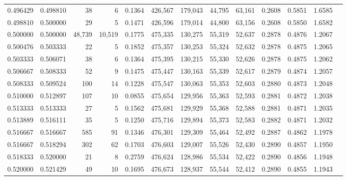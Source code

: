 \begin{tabular}{rrrrrrrrrrrrr}
0.496429 & 0.498810 &     38 &      6 &                                     0.1364 & 426,567 & 179,043 &  44,795 &  63,161 & 0.2608 & 0.5851 & 1.6585 \\
0.498810 & 0.500000 &     29 &      5 &                                     0.1471 & 426,596 & 179,014 &  44,800 &  63,156 & 0.2608 & 0.5850 & 1.6582 \\
0.500000 & 0.500000 & 48,739 & 10,519 &                                     0.1775 & 475,335 & 130,275 &  55,319 &  52,637 & 0.2878 & 0.4876 & 1.2067 \\
0.500476 & 0.503333 &     22 &      5 &                                     0.1852 & 475,357 & 130,253 &  55,324 &  52,632 & 0.2878 & 0.4875 & 1.2065 \\
0.503333 & 0.506071 &     38 &      6 &                                     0.1364 & 475,395 & 130,215 &  55,330 &  52,626 & 0.2878 & 0.4875 & 1.2062 \\
0.506667 & 0.508333 &     52 &      9 &                                     0.1475 & 475,447 & 130,163 &  55,339 &  52,617 & 0.2879 & 0.4874 & 1.2057 \\
0.508333 & 0.509524 &    100 &     14 &                                     0.1228 & 475,547 & 130,063 &  55,353 &  52,603 & 0.2880 & 0.4873 & 1.2048 \\
0.510000 & 0.512897 &    107 &     10 &                                     0.0855 & 475,654 & 129,956 &  55,363 &  52,593 & 0.2881 & 0.4872 & 1.2038 \\
0.513333 & 0.513333 &     27 &      5 &                                     0.1562 & 475,681 & 129,929 &  55,368 &  52,588 & 0.2881 & 0.4871 & 1.2035 \\
0.513889 & 0.516111 &     35 &      5 &                                     0.1250 & 475,716 & 129,894 &  55,373 &  52,583 & 0.2882 & 0.4871 & 1.2032 \\
0.516667 & 0.516667 &    585 &     91 &                                     0.1346 & 476,301 & 129,309 &  55,464 &  52,492 & 0.2887 & 0.4862 & 1.1978 \\
0.516667 & 0.518294 &    302 &     62 &                                     0.1703 & 476,603 & 129,007 &  55,526 &  52,430 & 0.2890 & 0.4857 & 1.1950 \\
0.518333 & 0.520000 &     21 &      8 &                                     0.2759 & 476,624 & 128,986 &  55,534 &  52,422 & 0.2890 & 0.4856 & 1.1948 \\
0.520000 & 0.521429 &     49 &     10 &                                     0.1695 & 476,673 & 128,937 &  55,544 &  52,412 & 0.2890 & 0.4855 & 1.1943 \\

\end{tabular}
